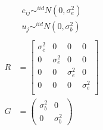 \documentclass[12pt,letterpaper,oneside]{article}\usepackage{graphicx, color}
\begin{document}
\begin{align*}
    e_{ij} \sim^{iid} N(0, \sigma^{2}_{e})\\
    u_{j} \sim^{iid} N(0,\sigma^{2}_{b}) \\
\end{align*}
\begin{align*}
    R &= \begin{bmatrix}
        \sigma^{2}_{e} & 0 & 0 & 0\\
        0 & \sigma^{2}_{e} & 0 & 0\\
        0 & 0 & \sigma^{2}_{e} & 0\\
        0 & 0 & 0 & \sigma^{2}_{e}\\
    \end{bmatrix}\\
    G &= \begin{pmatrix}
        \sigma^{2}_{b} & 0\\
        0 & \sigma^{2}_{b}
    \end{pmatrix}
\end{align*}
\end{document}
